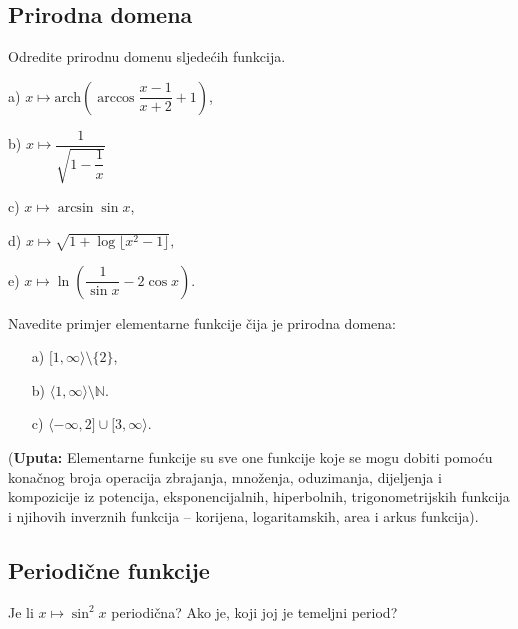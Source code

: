 \subsection*{Prirodna domena}
\begin{exercise}
Odredite prirodnu domenu sljedećih funkcija.
\begin{AutoMultiColItemize}
\item[a)] $x\mapsto \mathrm{arch}\left(\arccos{\dfrac{x-1}{x+2}}+1\right)$,
\item[b)] $x\mapsto \dfrac{1}{\sqrt{1-\dfrac{1}{x}}}$
\item[c)] $x\mapsto \arcsin{\sin{x}}$,
\item[d)] $x\mapsto \sqrt{1+\log\lfloor x^2-1\rfloor},$
\item[e)] $x\mapsto \ln\left(\dfrac{1}{\sin{x}}-2\cos{x}\right).$
\end{AutoMultiColItemize}
\end{exercise}
\begin{exercise} Navedite primjer elementarne funkcije čija je prirodna domena:
\begin{itemize}
\item[a)] $[1, \infty\rangle \setminus \{2\}$,
\item[b)] $\langle 1, \infty\rangle \setminus{\mathbb{N}}$.
\item[c)] $\langle -\infty, 2]\cup [3, \infty\rangle$.
\end{itemize}
(\textbf{Uputa:} Elementarne funkcije su sve one funkcije koje se mogu dobiti pomoću konačnog broja operacija zbrajanja, množenja, oduzimanja, dijeljenja i kompozicije iz potencija, eksponencijalnih, hiperbolnih, trigonometrijskih funkcija i njihovih inverznih funkcija -- korijena, logaritamskih, area i arkus funkcija).
\end{exercise}
\subsection*{Periodične funkcije}
\begin{exercise}
Je li $x\mapsto \sin^2{x}$ periodična? Ako je, koji joj je temeljni period?
\end{exercise}